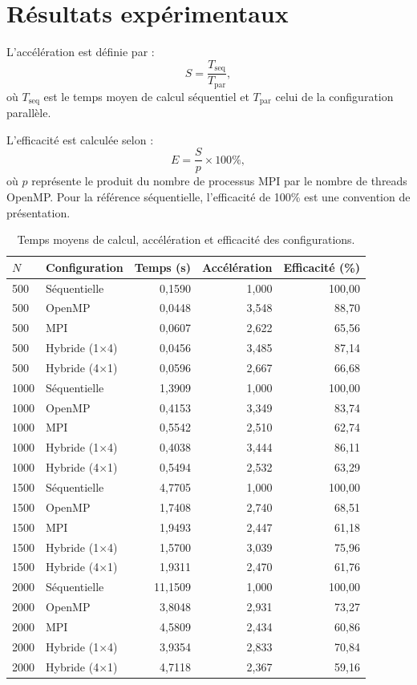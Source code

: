 \documentclass[11pt,a4paper]{article}
\begin{document}
	\section{Résultats expérimentaux}
	
	L'accélération est définie par :
	\[
	S=\frac{T_{\mathrm{seq}}}{T_{\mathrm{par}}},
	\]
	où $T_{\mathrm{seq}}$ est le temps moyen de calcul séquentiel et
	$T_{\mathrm{par}}$ celui de la configuration parallèle.
	
	L'efficacité est calculée selon :
	\[
	E=\frac{S}{p}\times100\%,
	\]
	où $p$ représente le produit du nombre de processus MPI par le nombre
	de threads OpenMP. Pour la référence séquentielle, l'efficacité de 100\%
	est une convention de présentation.
	
	\begin{table}[H]
		\centering
		\small
		\begin{tabular}{llrrr}
			\toprule
			$N$ & Configuration & Temps (s) & Accélération & Efficacité (\%) \\
			\midrule
			500 & Séquentielle & 0,1590 & 1,000 & 100,00 \\
			500 & OpenMP & 0,0448 & 3,548 & 88,70 \\
			500 & MPI & 0,0607 & 2,622 & 65,56 \\
			500 & Hybride (1$\times$4) & 0,0456 & 3,485 & 87,14 \\
			500 & Hybride (4$\times$1) & 0,0596 & 2,667 & 66,68 \\
			\midrule
			1000 & Séquentielle & 1,3909 & 1,000 & 100,00 \\
			1000 & OpenMP & 0,4153 & 3,349 & 83,74 \\
			1000 & MPI & 0,5542 & 2,510 & 62,74 \\
			1000 & Hybride (1$\times$4) & 0,4038 & 3,444 & 86,11 \\
			1000 & Hybride (4$\times$1) & 0,5494 & 2,532 & 63,29 \\
			\midrule
			1500 & Séquentielle & 4,7705 & 1,000 & 100,00 \\
			1500 & OpenMP & 1,7408 & 2,740 & 68,51 \\
			1500 & MPI & 1,9493 & 2,447 & 61,18 \\
			1500 & Hybride (1$\times$4) & 1,5700 & 3,039 & 75,96 \\
			1500 & Hybride (4$\times$1) & 1,9311 & 2,470 & 61,76 \\
			\midrule
			2000 & Séquentielle & 11,1509 & 1,000 & 100,00 \\
			2000 & OpenMP & 3,8048 & 2,931 & 73,27 \\
			2000 & MPI & 4,5809 & 2,434 & 60,86 \\
			2000 & Hybride (1$\times$4) & 3,9354 & 2,833 & 70,84 \\
			2000 & Hybride (4$\times$1) & 4,7118 & 2,367 & 59,16 \\
			\bottomrule
		\end{tabular}
		\caption{Temps moyens de calcul, accélération et efficacité des configurations.}
	\end{table}
	
\end{document}
